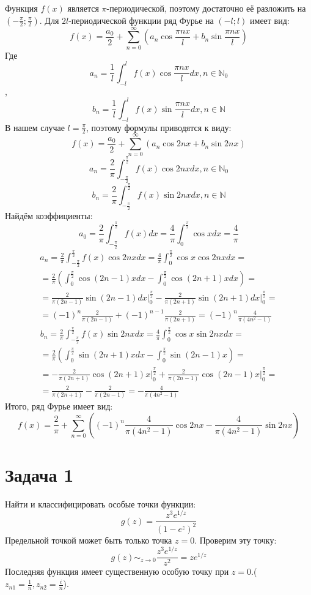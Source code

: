\documentclass[11pt]{article}
\begin{document}
Функция \(f(x)\) является \(\pi\)-периодической, поэтому достаточно её разложить на \(\left(-\frac{\pi}2; \frac{\pi}2\right)\).
Для \(2l\)-периодической функции ряд Фурье на \((-l; l)\) имеет вид:
$$f(x) = \frac{a_0}2 + \sum_{n = 0}^\infty\left(a_n\cos\frac{\pi nx}l + b_n\sin\frac{\pi nx}l\right)$$
Где
$$a_n = \frac{1}l\int_{-l}^lf(x)\cos\frac{\pi nx}ldx, n \in \mathbb{N}_0$$, $$b_n = \frac{1}l\int_{-l}^lf(x)\sin\frac{\pi nx}ldx, n \in \mathbb{N}$$
В нашем случае \(l = \frac{\pi}2\), поэтому формулы приводятся к виду:
$$f(x) = \frac{a_0}2 + \sum_{n = 0}^\infty\left(a_n\cos 2nx + b_n\sin 2nx\right)$$
$$a_n = \frac{2}\pi\int_{-\frac{\pi}2}^{\frac{\pi}2}f(x)\cos 2nxdx, n \in \mathbb{N}_0$$
$$b_n = \frac{2}\pi\int_{-\frac{\pi}2}^{\frac{\pi}2}f(x)\sin 2nxdx, n \in \mathbb{N}$$
Найдём коэффициенты:
$$a_0 = \frac{2}\pi\int_{-\frac{\pi}2}^\frac{\pi}2f(x)dx = \frac{4}\pi\int_0^\frac{\pi}2\cos xdx = \frac{4}\pi$$
\begin{multline*}
a_n = \frac{2}\pi\int_{-\frac{\pi}2}^\frac{\pi}2f(x)\cos 2nxdx = \frac{4}\pi\int_0^\frac{\pi}2\cos x\cos 2nxdx = \\
 = \frac{2}\pi\left(\int_0^\frac{\pi}2\cos(2n-1)xdx - \int_0^\frac{\pi}2\cos(2n+1)xdx\right) = \\
 = \frac{2}{\pi(2n - 1)}\sin(2n-1)dx\bigg|_0^\frac{\pi}2 - \frac{2}{\pi(2n+1)}\sin(2n+1)dx\bigg|_0^\frac{\pi}2 = \\
 = (-1)^n\frac{2}{\pi(2n-1)} + (-1)^{n-1}\frac{2}{\pi(2n+1)} = (-1)^n\frac{4}{\pi(4n^2 - 1)}
\end{multline*}
\begin{multline*}
b_n = \frac{2}\pi\int_{-\frac{\pi}2}^\frac{\pi}2f(x)\sin 2nxdx = \frac{4}\pi\int_0^\frac{\pi}2\cos x\sin 2nxdx = \\
 = \frac{2}\pi\left(\int_0^\frac{\pi}2\sin(2n+1)xdx - \int_0^\frac{\pi}2\sin(2n-1)x\right) = \\
 = -\frac{2}{\pi(2n+1)}\cos(2n+1)x\bigg|_0^\frac{\pi}2 + \frac{2}{\pi(2n-1)}\cos(2n-1)x\bigg|_0^\frac{\pi}2 = \\
 = \frac{2}{\pi(2n+1)} - \frac{2}{\pi(2n - 1)} = -\frac{4}{\pi(4n^2-1)}
\end{multline*}
Итого, ряд Фурье имеет вид:
$$f(x) = \frac{2}\pi + \sum_{n = 0}^\infty\left((-1)^n\frac{4}{\pi(4n^2-1)}\cos 2nx - \frac{4}{\pi(4n^2-1)}\sin 2nx\right)$$
\section{Задача 1}
\label{sec:orgb03710e}
Найти и классифицировать особые точки функции:
$$g(z) = \frac{z^3e^{1/z}}{(1 - e^z)^2}$$
Предельной точкой может быть только точка \(z = 0\). Проверим эту точку:
$$g(z) \sim_{z \to 0} \frac{z^3e^{1/z}}{z^2} = ze^{1/z}$$
Последняя функция имеет существенную особую точку при \(z = 0\).(\(z_{n1} = \frac{1}n, z_{n2} = \frac{i}n\)).
\end{document}

